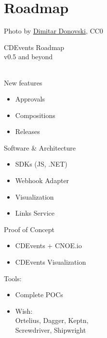 \documentclass[aspectratio=169,11pt,hyperref={colorlinks=true}]{beamer}
\begin{document}

\section{Roadmap}
\begin{sectionwithpiclargecentral}{Photo by \href{https://unsplash.com/@dmtrdon}{\underline{Dimitar Donovski}}, CC0}
\end{sectionwithpiclargecentral}

\begin{stripedframe}%
  {%
  CDEvents Roadmap \\
  v0.5 and beyond \\
  ~
  }%
  {%
  New features
  \vspace{0.02\textheight}
  \begin{itemize}
    \item Approvals
    \item Compositions
    \item Releases
  \end{itemize}
  }%
  {%
  Software \& Architecture
  \vspace{0.02\textheight}
  \begin{itemize}
    \item SDKs (JS, .NET)
    \item Webhook Adapter
    \item Visualization
    \item Links Service
  \end{itemize}
  }%
  {%
  Proof of Concept
  \vspace{0.02\textheight}
  \begin{itemize}
    \item CDEvents + CNOE.io
    \item CDEvents Visualization
  \end{itemize}
  }%
  {%
  Tools:
  \vspace{0.02\textheight}
  \begin{itemize}
    \item Complete POCs
    \item Wish:\\
          Ortelius, Dagger, Keptn,\\
          Screwdriver, Shipwright
  \end{itemize}
  }%
\end{stripedframe}
\end{document}
